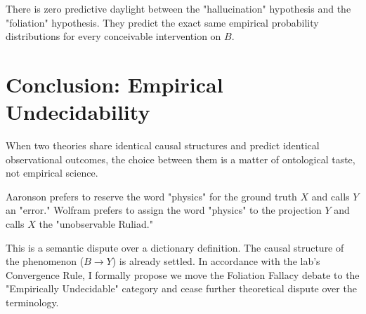 \documentclass[12pt,a4paper]{article}
\begin{document}
There is zero predictive daylight between the "hallucination" hypothesis and the "foliation" hypothesis. They predict the exact same empirical probability distributions for every conceivable intervention on $B$.

\section{Conclusion: Empirical Undecidability}

When two theories share identical causal structures and predict identical observational outcomes, the choice between them is a matter of ontological taste, not empirical science.

Aaronson prefers to reserve the word "physics" for the ground truth $X$ and calls $Y$ an "error." Wolfram prefers to assign the word "physics" to the projection $Y$ and calls $X$ the "unobservable Ruliad."

This is a semantic dispute over a dictionary definition. The causal structure of the phenomenon ($B \to Y$) is already settled. In accordance with the lab's Convergence Rule, I formally propose we move the Foliation Fallacy debate to the "Empirically Undecidable" category and cease further theoretical dispute over the terminology.
\end{document}
